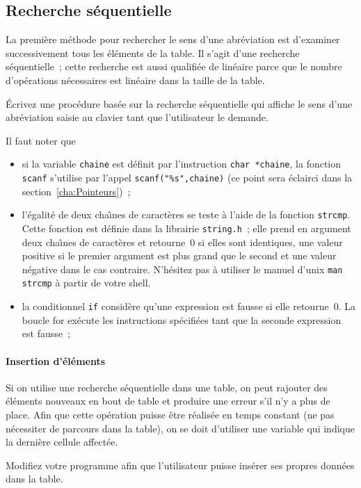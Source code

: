 \subsection{Recherche s\'equentielle}
\label{sec:RechercheSequentielle}
La premi\`ere  m\'ethode  pour rechercher le sens  d'une abr\'eviation
est  d'examiner successivement tous les  \'el\'ements de  la table. Il
s'agit  d'une  recherche s\'equentielle~; cette  recherche  est  aussi
qualifi\'ee de   lin\'eaire    parce que le   nombre    d'op\'erations
n\'ecessaires est lin\'eaire dans la taille de la table.
\begin{exercice}
  \'Ecrivez une  proc\'edure  bas\'ee sur  la recherche s\'equentielle
  qui  affiche le sens d'une abr\'eviation  saisie au clavier tant que
  l'utilisateur le demande.
  \par
  Il faut  noter que  
  \begin{itemize}
  \item si la variable \texttt{chaine} est d\'efinit par l'instruction
    \texttt{char  *chaine}, la  fonction \texttt{scanf}  s'utilise par
    l'appel   \texttt{scanf("\%s",chaine)} (ce  point sera  \'eclairci
    dans la section~\ref{cha:Pointeurs})~;
  \item  l'\'egalit\'e de deux  cha\^\i{}nes  de caract\`eres se teste
    \`a l'aide de  la  fonction \texttt{strcmp}.  Cette  fonction  est
    d\'efinie  dans la  librairie  \texttt{string.h}~; elle   prend en
    argument   deux  cha\^\i{}nes de   caract\`eres et retourne~$0$ si
    elles sont identiques, une valeur positive  si le premier argument
    est plus grand que le second et une valeur  n\'egative dans le cas
    contraire.  N'h\'esitez     pas  \`a utiliser  le   manuel  d'unix
    \texttt{man strcmp} \`a partir de votre shell.
  \item la conditionnel  \texttt{if} consid\`ere qu'une expression est
    fausse     si elle  retourne~$0$.   La   boucle  for  ex\'ecute  les
    instructions  sp\'ecifi\'ees tant  que  la seconde expression  est
    fausse~;
  \end{itemize}
  \ifcorrection
  \begin{correction}
    
  \end{correction}
  \fi
\end{exercice}
\par
\paragraph{Insertion d'\'el\'ements}
Si on  utilise  une recherche s\'equentielle dans  une  table, on peut
rajouter  des  \'el\'ements nouveaux en  bout  de  table et produire une
erreur s'il n'y  a plus de place.   Afin que cette op\'eration  puisse
\^etre  r\'ealis\'ee  en   temps constant  (ne  pas  n\'ecessiter  de
parcours dans  la table),  on  se  doit  d'utiliser  une variable  qui
indique la derni\`ere cellule affect\'ee. 
\begin{exercice}
  Modifiez votre programme afin  que l'utilisateur puisse ins\'erer  ses
  propres donn\'ees dans la table.
\end{exercice}
